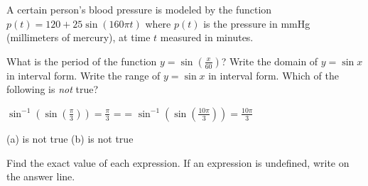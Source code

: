 \documentclass[11pt,answers]{exam}
\makeatletter
\newcommand{\inlineitem}[1][]{%
\ifnum\enit@type=\tw@
    {\descriptionlabel{#1}}
  \hspace{\labelsep}%
\else
  \ifnum\enit@type=\z@
       \refstepcounter{\@listctr}\fi
    \quad\@itemlabel\hspace{\labelsep}%
\fi}
\makeatother
\begin{document}
\begin{questions}
A certain person's blood pressure is modeled by the function
$\displaystyle p(t) = 120 + 25 \sin(160\pi t)$
where $p(t)$ is the pressure in mmHg (millimeters of mercury), at time $t$ measured in minutes.


\newpage
\bonusquestion[1] What is the period of the function $\displaystyle y=\sin\left (\frac{x}{60}\right )$? \dotfill
\question[2] Write the domain of $\displaystyle y=\sin x$ in interval form. \dotfill
\question[2] Write the range of $\displaystyle y=\sin x$ in interval form. \dotfill
\question[1] Which of the following is {\emph{not}} true?
\begin{enumerate*}[label=\textcolor{red}{\bf (\alph*)}]
\item $\displaystyle \sin^{-1}\left (\sin \left(\frac{\pi}{3}\right )\right )=\frac{\pi}{3}$
\inlineitem $\displaystyle \sin^{-1}\left (\sin \left(\frac{10\pi}{3}\right )\right )=\frac{10\pi}{3}$
\end{enumerate*}
\begin{oneparchoices}
\choice (a) is not true
\choice (b) is not true   
\end{oneparchoices}
\question Find the exact value of each expression. If an expression is undefined, write {} on the answer line.
\end{questions}
\end{document}
